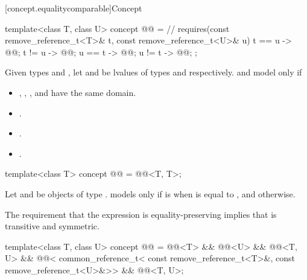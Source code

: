 [concept.equalitycomparable]{Concept }

\begin{itemdecl}
template<class T, class U>
  concept @@ = // \expos
    requires(const remove_reference_t<T>& t,
             const remove_reference_t<U>& u) {
      { t == u } -> @@;
      { t != u } -> @@;
      { u == t } -> @@;
      { u != t } -> @@;
    };
\end{itemdecl}

\begin{itemdescr}
\pnum
Given types  and ,
let  and  be lvalues of types
 and
 respectively.
 and  model
 only if
\begin{itemize}
\item {}, , , and 
      have the same domain.
\item {}.
\item {}.
\item {}.
\end{itemize}
\end{itemdescr}

\begin{itemdecl}
template<class T>
  concept @@ = @@<T, T>;
\end{itemdecl}

\begin{itemdescr}
\pnum
Let  and  be objects of type .
 models  only if
 is  when  is equal to
, and  otherwise.

\pnum
\begin{note}
The requirement that the expression  is equality-preserving
implies that \tcode{==} is transitive and symmetric.
\end{note}
\end{itemdescr}

\begin{itemdecl}
template<class T, class U>
  concept @@ =
    @@<T> && @@<U> &&
    @@<T, U> &&
    @@<
      common_reference_t<
        const remove_reference_t<T>&,
        const remove_reference_t<U>&>> &&
    @@<T, U>;
\end{itemdecl}

